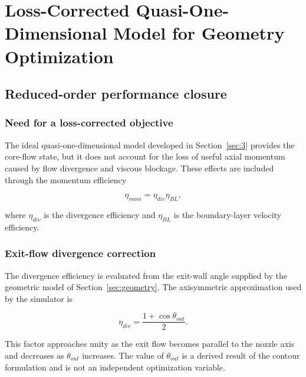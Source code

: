 \section{Loss-Corrected Quasi-One-Dimensional Model for Geometry Optimization}
\label{sec:loss_corrected_model}

\subsection{Reduced-order performance closure}

\subsubsection{Need for a loss-corrected objective}

The ideal quasi-one-dimensional model developed in Section~\ref{sec:3} provides the core-flow
state, but it does not account for the loss of useful axial momentum caused by flow
divergence and viscous blockage. These effects are included through the momentum
efficiency

\begin{equation}
\boxed{
\eta_{mom}=\eta_{div}\eta_{BL}
},
\label{eq:momentum_efficiency}
\end{equation}

where \(\eta_{div}\) is the divergence efficiency and \(\eta_{BL}\) is the
boundary-layer velocity efficiency.

\subsubsection{Exit-flow divergence correction}

The divergence efficiency is evaluated from the exit-wall angle supplied by the
geometric model of Section~\ref{sec:geometry}. The axisymmetric approximation used by the simulator is

\begin{equation}
\boxed{
\eta_{div}
=
\frac{1+\cos\theta_{out}}{2}
}.
\label{eq:divergence_efficiency}
\end{equation}

This factor approaches unity as the exit flow becomes parallel to the nozzle axis and
decreases as \(\theta_{out}\) increases. The value of \(\theta_{out}\) is a derived
result of the contour formulation and is not an independent optimization variable.

